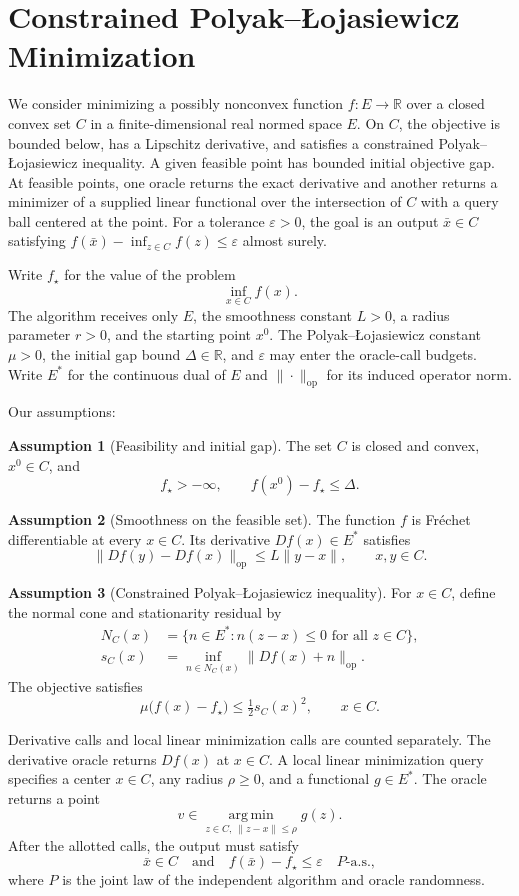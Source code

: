 \documentclass[10pt]{article}
\theoremstyle{definition}
\newtheorem{assumption}{Assumption}
\begin{document}
\section*{Constrained Polyak--\L{}ojasiewicz Minimization}
We consider minimizing a possibly nonconvex function $f:E\to\mathbb{R}$ over a closed convex set $C$ in a finite-dimensional real normed space $E$. On $C$, the objective is bounded below, has a Lipschitz derivative, and satisfies a constrained Polyak--\L{}ojasiewicz inequality. A given feasible point has bounded initial objective gap. At feasible points, one oracle returns the exact derivative and another returns a minimizer of a supplied linear functional over the intersection of $C$ with a query ball centered at the point. For a tolerance $\varepsilon>0$, the goal is an output $\bar{x}\in C$ satisfying $f(\bar{x})-\inf_{z\in C}f(z)\leq\varepsilon$ almost surely.

Write $f_\star$ for the value of the problem
\[
\inf_{x\in C} f(x).
\]
The algorithm receives only $E$, the smoothness constant $L>0$, a radius parameter $r>0$, and the starting point $x^0$. The Polyak--\L{}ojasiewicz constant $\mu>0$, the initial gap bound $\Delta\in\mathbb{R}$, and $\varepsilon$ may enter the oracle-call budgets. Write $E^*$ for the continuous dual of $E$ and $\|\cdot\|_{\mathrm{op}}$ for its induced operator norm.

Our assumptions:
\begin{assumption}[Feasibility and initial gap]
The set $C$ is closed and convex, $x^0\in C$, and
\[
 f_\star> -\infty,\qquad f(x^0)-f_\star\leq\Delta.
\]
\end{assumption}

\begin{assumption}[Smoothness on the feasible set]
The function $f$ is Fr\'echet differentiable at every $x\in C$. Its derivative $Df(x)\in E^*$ satisfies
\[
\|Df(y)-Df(x)\|_{\mathrm{op}}\leq L\|y-x\|,\qquad x,y\in C.
\]
\end{assumption}

\begin{assumption}[Constrained Polyak--\L{}ojasiewicz inequality]
For $x\in C$, define the normal cone and stationarity residual by
\[
\begin{aligned}
N_C(x)&=\{n\in E^*: n(z-x)\leq 0\text{ for all }z\in C\},\\
s_C(x)&=\inf_{n\in N_C(x)}\|Df(x)+n\|_{\mathrm{op}}.
\end{aligned}
\]
The objective satisfies
\[
\mu\bigl(f(x)-f_\star\bigr)\leq \tfrac12 s_C(x)^2,\qquad x\in C.
\]
\end{assumption}

Derivative calls and local linear minimization calls are counted separately. The derivative oracle returns $Df(x)$ at $x\in C$. A local linear minimization query specifies a center $x\in C$, any radius $\rho\geq 0$, and a functional $g\in E^*$. The oracle returns a point
\[
v\in\operatorname*{arg\,min}_{z\in C,\ \|z-x\|\leq\rho} g(z).
\]
After the allotted calls, the output must satisfy
\[
\bar{x}\in C\quad\text{and}\quad f(\bar{x})-f_\star\leq\varepsilon
\quad P\text{-a.s.},
\]
where $P$ is the joint law of the independent algorithm and oracle randomness.
\end{document}
